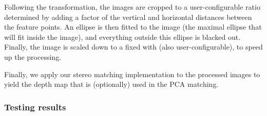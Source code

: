Following the transformation, the images are cropped to a user-configurable
ratio determined by adding a factor of the vertical and horizontal distances
between the feature points. An ellipse is then fitted to the image (the maximal
ellipse that will fit inside the image), and everything outside this ellipse is
blacked out. Finally, the image is scaled down to a fixed with (also
user-configurable), to speed up the processing.

Finally, we apply our stereo matching implementation to the processed images to
yield the depth map that is (optionally) used in the PCA matching.

\subsubsection{Testing results}

